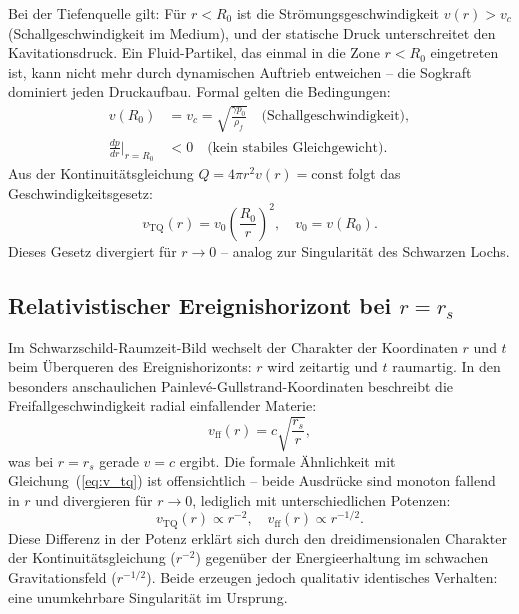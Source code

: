 ﻿\documentclass[12pt,a4paper]{report}
\begin{document}
Bei der Tiefenquelle gilt: Für $r < R_0$ ist die Strömungsgeschwindigkeit $v(r) > v_c$ (Schallgeschwindigkeit im Medium), und der statische Druck unterschreitet den Kavitationsdruck. Ein Fluid-Partikel, das einmal in die Zone $r < R_0$ eingetreten ist, kann nicht mehr durch dynamischen Auftrieb entweichen -- die Sogkraft dominiert jeden Druckaufbau. Formal gelten die Bedingungen:
\begin{align}
	v(R_0) &= v_c = \sqrt{\frac{\gamma p_0}{\rho_f}} \quad \text{(Schallgeschwindigkeit)}, \label{eq:bedingung_r0}\\
	\frac{dp}{dr}\bigg|_{r=R_0} &< 0 \quad \text{(kein stabiles Gleichgewicht)}.
	\label{eq:instabilitaet_r0}
\end{align}
Aus der Kontinuitätsgleichung $Q = 4\pi r^2 v(r) = \mathrm{const}$ folgt das Geschwindigkeitsgesetz:
\begin{equation}
	v_{\mathrm{TQ}}(r) = v_0 \left(\frac{R_0}{r}\right)^2, \quad v_0 = v(R_0).
	\label{eq:v_tq}
\end{equation}
Dieses Gesetz divergiert für $r \to 0$ -- analog zur Singularität des Schwarzen Lochs.

\subsection{Relativistischer Ereignishorizont bei $r = r_s$}

Im Schwarzschild-Raumzeit-Bild wechselt der Charakter der Koordinaten $r$ und $t$ beim Überqueren des Ereignishorizonts: $r$ wird zeitartig und $t$ raumartig. In den besonders anschaulichen Painlevé-Gullstrand-Koordinaten \cite{painleve1921} beschreibt die Freifallgeschwindigkeit radial einfallender Materie:
\begin{equation}
	v_{\mathrm{ff}}(r) = c\sqrt{\frac{r_s}{r}},
	\label{eq:v_ff_bh}
\end{equation}
was bei $r = r_s$ gerade $v = c$ ergibt. Die formale Ähnlichkeit mit Gleichung~(\ref{eq:v_tq}) ist offensichtlich -- beide Ausdrücke sind monoton fallend in $r$ und divergieren für $r \to 0$, lediglich mit unterschiedlichen Potenzen:
\begin{equation}
	v_{\mathrm{TQ}}(r) \propto r^{-2}, \quad v_{\mathrm{ff}}(r) \propto r^{-1/2}.
	\label{eq:potenz_vergleich}
\end{equation}
Diese Differenz in der Potenz erklärt sich durch den dreidimensionalen Charakter der Kontinuitätsgleichung ($r^{-2}$) gegenüber der Energieerhaltung im schwachen Gravitationsfeld ($r^{-1/2}$). Beide erzeugen jedoch qualitativ identisches Verhalten: eine unumkehrbare Singularität im Ursprung.
\end{document}

